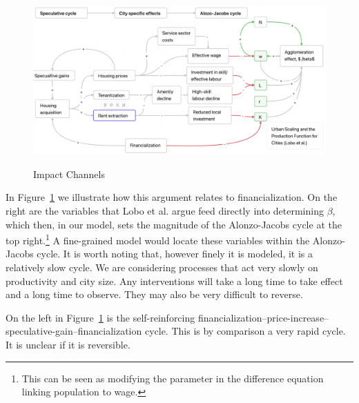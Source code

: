 {\newpage\thispagestyle{empty}
\vspace{-1.5cm}
\begin{figure}
\vspace{-1cm}
\caption{Impact Channels}
\begin{adjustwidth}{-0.24\textwidth}{-0.24\textwidth}
    \centering
    \includegraphics[scale=.45, angle=90]{fig/impact_channels_revised.png}
    \label{fig-impact-channels}
\end{adjustwidth}
\end{figure}
}


 In Figure~\ref{fig-impact-channels} we illustrate how this argument relates to financialization. On the right are the variables that  Lobo et al. \cite{loboUrbanScalingProduction2013} argue feed directly into determining $\beta$, which then, in our model, sets the magnitude of the \gls{Alonzo-Jacobs cycle} at the top right.\footnote{This can be seen as modifying  the parameter in  the difference equation linking population to wage.} A fine-grained model would locate these variables within the Alonzo-Jacobs cycle. It is worth noting that, however finely it is modeled, it is  a relatively slow cycle. We are considering processes that act very slowly on productivity and city size. Any interventions will take a long time to take effect and a long time to observe. They may also be very difficult to reverse. 
 
 
 On the left in Figure~\ref{fig-impact-channels} is the self-reinforcing financialization--price-increase-- speculative-gain--financialization cycle. This is by comparison a very rapid cycle. It is unclear if it is reversible. 
 
